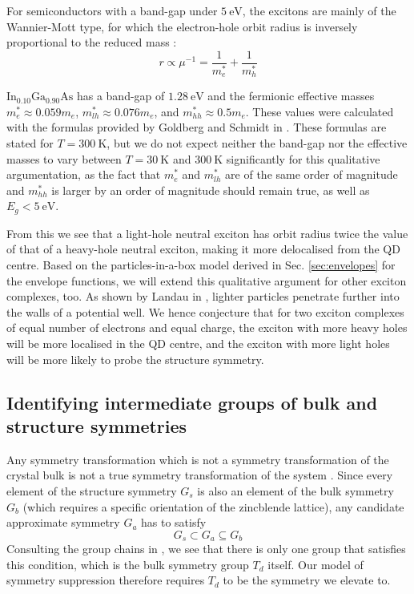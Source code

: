For semiconductors with a band-gap under $\SI{5}{\electronvolt}$, the excitons are mainly of the Wannier-Mott type, for which the electron-hole orbit radius is inversely proportional to the reduced mass \cite[p. 78]{fox}:
\begin{equation}
r\propto \mu^{-1} = \frac{1}{m_e^*}+\frac{1}{m_h^*}
\end{equation}

$\text{In}_{0.10}\text{Ga}_{0.90}\text{As}$ has a band-gap of $\SI{1.28}{\electronvolt}$ and the fermionic effective masses $m^*_e\approx 0.059m_e$, $m^*_{lh}\approx 0.076m_e$, and $m^*_{hh}\approx 0.5m_e$. These values were calculated with the formulas provided by Goldberg and Schmidt in \cite[p. 62]{semiconductor_handbook}. These formulas are stated for $T=\SI{300}{\kelvin}$, but we do not expect neither the band-gap nor the effective masses to vary between $T=\SI{30}{\kelvin}$ and $\SI{300}{\kelvin}$ significantly for this qualitative argumentation, as the fact that $m_e^*$ and $m_{lh}^*$ are of the same order of magnitude and $m_{hh}^*$ is larger by an order of magnitude should remain true, as well as $E_g < \SI{5}{\electronvolt}$.

From this we see that a light-hole neutral exciton has orbit radius twice the value of that of a heavy-hole neutral exciton, making it more delocalised from the QD centre. Based on the particles-in-a-box model derived in Sec. \ref{sec:envelopes} for the envelope functions, we will extend this qualitative argument for other exciton complexes, too. As shown by Landau in \cite[p. 64]{landau}, lighter particles penetrate further into the walls of a potential well. We hence conjecture that for two exciton complexes of equal number of electrons and equal charge, the exciton with more heavy holes will be more localised in the QD centre, and the exciton with more light holes will be more likely to probe the structure symmetry.

\subsection{Identifying intermediate groups of bulk and structure symmetries}
Any symmetry transformation which is not a symmetry transformation of the crystal bulk is not a true symmetry transformation of the system \cite{bulk_limiting}. Since every element of the structure symmetry $G_s$ is also an element of the bulk symmetry $G_b$ (which requires a specific orientation of the zincblende lattice), any candidate approximate symmetry $G_a$ has to satisfy
\begin{equation} \label{eq:group_chain}
G_s \subset G_a \subseteq G_b
\end{equation}
Consulting the group chains in \cite[Ch.9]{altmann}, we see that there is only one group that satisfies this condition, which is the bulk symmetry group $T_d$ itself. Our model of symmetry suppression therefore requires $T_d$ to be the symmetry we elevate to.

